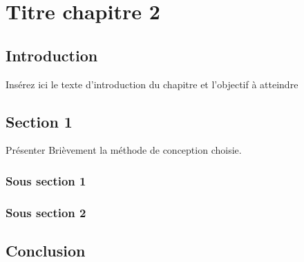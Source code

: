 \chapter{Titre chapitre 2}
\section{Introduction}
Insérez ici le texte d’introduction du chapitre et l’objectif à atteindre

\section{Section 1}
Présenter Brièvement la méthode de conception choisie.
\subsection{Sous section 1}
\subsection{Sous section 2}

\section{Conclusion}
